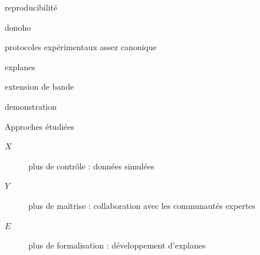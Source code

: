 reproducibilité

donoho

protocoles expérimentaux assez canonique

explanes

extension de bande

demonstration






\begin{frame}{Approches étudiées}
\begin{center}
\end{center}
\vspace{.8cm}
\begin{description}
\item[$X$] plus de contrôle : données simulées
\item[$Y$] plus de maîtrise : collaboration avec les communautés expertes
\item[$E$] plus de formalisation : développement d'explanes
\end{description}
\end{frame}
